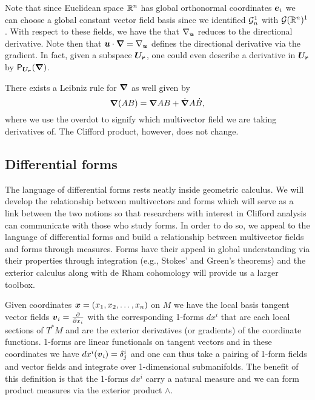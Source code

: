 Note that since Euclidean space $\mathbb{R}^n$ has global orthonormal coordinates $\boldsymbol{e}_i$ we can choose a global constant vector field basis since we identified $\mathcal{G}_n^1$ with $\mathcal{G}(\mathbb{R}^n)^1$. With respect to these fields, we have the that $\nabla_{\boldsymbol{u}}$ reduces to the directional derivative. Note then that $\boldsymbol{u} \cdot \boldsymbol{\nabla} = \nabla_{\boldsymbol{u}}$ defines the directional derivative via the gradient. In fact, given a subspace $\boldsymbol{U_r}$, one could even describe a derivative in $\boldsymbol{U_r}$ by $\mathsf{P}_{\boldsymbol{U_r}}(\boldsymbol{\nabla})$.

There exists a Leibniz rule for $\boldsymbol{\nabla}$ as well given by
\begin{equation}
\boldsymbol{\nabla}(AB) = \boldsymbol{\nabla} A B + \dot{\boldsymbol{\nabla}}A\dot{B},
\end{equation}
where we use the overdot to signify which multivector field we are taking derivatives of. The Clifford product, however, does not change. 

\subsection{Differential forms}
\label{subsec:differential_forms}

The language of differential forms \cite{guillemin_differential_2010} rests neatly inside geometric calculus. We will develop the relationship between multivectors and forms which will serve as a link between the two notions so that researchers with interest in Clifford analysis can communicate with those who study forms. In order to do so, we appeal to the language of differential forms and build a relationship between multivector fields and forms through measures. Forms have their appeal in global understanding via their properties through integration (e.g., Stokes' and Green's theorems) and the exterior calculus along with de Rham cohomology will provide us a larger toolbox.

Given coordinates $\boldsymbol{x}=(x_1,x_2,\dots,x_n)$ on $M$ we have the local basis tangent vector fields $\boldsymbol{v}_i=\frac{\partial}{\partial x_i}$  with the corresponding 1-forms $dx^i$ that are each local sections of $T^*M$ and are the exterior derivatives (or gradients) of the coordinate functions.  1-forms are linear functionals on tangent vectors and in these coordinates we have $dx^i  (\boldsymbol{v}_i) = \delta^i_j$ and one can thus take a pairing of 1-form fields and vector fields and integrate over 1-dimensional submanifolds. The benefit of this definition is that the 1-forms $dx^i$ carry a natural measure and we can form product measures via the exterior product $\wedge$.

